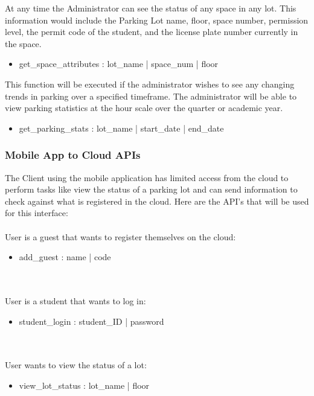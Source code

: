 \documentclass[paper=a4, fontsize=12pt]{scrartcl}
\numberwithin{equation}{section}		%
\numberwithin{figure}{section}			%
\numberwithin{table}{section}				%
\begin{document}
At any time the Administrator can see the status of any space in any lot. This information would include the Parking Lot name, floor, space number, permission level, the permit code of the student, and the license plate number currently in the space.
\begin{itemize}
  \item get\_space\_attributes : lot\_name | space\_num | floor
  \end{itemize}
This function will be executed if the administrator wishes to see any changing trends in parking over a specified timeframe. The administrator will be able to view parking statistics at the hour scale over the quarter or academic year. 
\begin{itemize}
  \item get\_parking\_stats : lot\_name | start\_date | end\_date
  \end{itemize}

\subsubsection{Mobile App to Cloud APIs} \label{cloudMobileAPIs}
The Client using the mobile application has limited access from the cloud to perform tasks like view the status of a parking lot and can send information to check against what is registered in the cloud. Here are the API's that will be used for this interface:
\\\\
User is a guest that wants to register themselves on the cloud:
\begin{itemize}
  \item add\_guest : name | code
  \end{itemize}
\\\\
User is a student that wants to log in:
\begin{itemize}
  \item student\_login : student\_ID | password
  \end{itemize}
\\\\
User wants to view the status of a lot:
\begin{itemize}
  \item view\_lot\_status : lot\_name | floor
  \end{itemize}
\\\\

\end{document}
